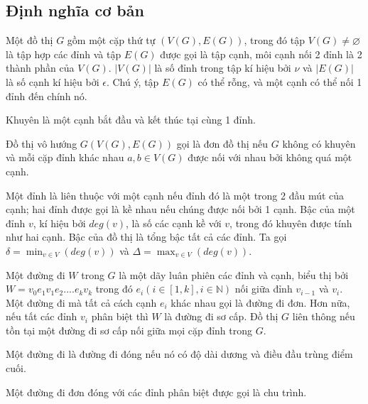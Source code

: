 \subsection{Định nghĩa cơ bản}


\begin{definition}[Đồ thị]
    Một đồ thị $G$ gồm một cặp thứ tự $(V(G),E(G))$, trong đó tập $V(G) \neq \varnothing $ là tập hợp các đỉnh và tập $E(G)$ được gọi là tập cạnh,
    môi cạnh nối 2 đỉnh là 2 thành phần của $V(G)$.
    $|V(G)|$ là số đỉnh trong tập kí hiệu bởi $\nu$ và $|E(G)|$ là số cạnh kí hiệu bởi $\epsilon$.
    Chú ý, tập $E(G)$ có thể rỗng, và một cạnh có thể nối 1 đỉnh đến chính nó.
\end{definition}

\begin{definition}[Khuyên]
    Khuyên là một cạnh bắt đầu và kết thúc tại cùng 1 đỉnh.
\end{definition}

\begin{definition}
    Đồ thị vô hướng $G(V(G),E(G))$ gọi là đơn đồ thị nếu $G$ không có khuyên và mỗi cặp đỉnh khác nhau $a,b \in V(G)$ được nối với nhau bởi không quá một cạnh.
\end{definition}

\begin{definition}
    Một đỉnh là liên thuộc với một cạnh nếu đỉnh đó là một trong 2 đầu mút của cạnh; hai đỉnh được gọi là kề nhau nếu chúng được nối bởi 1 cạnh.
    Bậc của một đỉnh $v$, kí hiệu bởi $deg(v)$, là số các cạnh kề với $v$, trong đó khuyên được tính như hai cạnh. Bậc của đồ thị là tổng bậc tất cả các đỉnh.
    Ta gọi $\delta = \displaystyle\min_{v \in V}(deg (v))$ và $\Delta = \displaystyle\max_{v \in V}(deg (v))$.
\end{definition}

\begin{definition}
    Một đường đi $W$ trong $G$ là một dãy luân phiên các đỉnh và cạnh, biểu thị bởi $W=v_0e_1v_1e_2....e_kv_k$ trong đó $e_i (i \in [1,k], i \in \mathbb{N})$ nối giữa đỉnh $v_{i-1}$ và $v_i$.
    Một đường đi mà tất cả cách cạnh $e_i$ khác nhau gọi là đường đi đơn.
    Hơn nữa, nếu tất các đỉnh $v_i$ phân biệt thì $W$ là đường đi sơ cấp.
    Đồ thị $G$ liên thông nếu tồn tại một đường đi sơ cấp nối giữa mọi cặp đỉnh trong $G$.

    Một đường đi là đường đi đóng nếu nó có độ dài dương và điều đầu trùng điểm cuối.

    Một đường đi đơn đóng với các đỉnh phân biệt được gọi là chu trình.
\end{definition}

